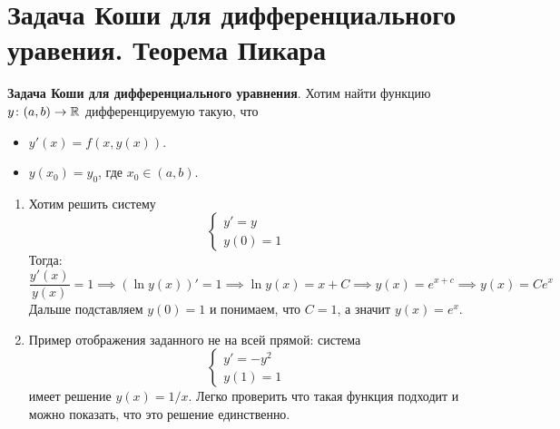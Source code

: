 \section{Задача Коши для дифференциального уравения. Теорема Пикара}
\begin{conj}
\textbf{Задача Коши для дифференциального уравнения}. Хотим найти функцию $y\colon (a, b) \to \mathbb{R}$ дифференцируемую такую, что
\begin{itemize}
    \item $y'(x) = f(x, y(x))$.
    \item $y(x_0) = y_0$, где $x_0 \in (a, b)$.
\end{itemize}
\end{conj}

\begin{examples}
\begin{enumerate}
    \item
    Хотим решить систему
    \begin{equation*}
    \begin{cases}
        y' = y \\
        y(0) = 1
    \end{cases}
    \end{equation*}
    Тогда:
    \begin{equation*}
    \frac{y'(x)}{y(x)} = 1 \implies (\ln y(x))' = 1 \implies \ln y(x) = x + C \implies y(x) = e^{x + c} \implies y(x) = Ce^x
    \end{equation*}
    Дальше подставляем $y(0) = 1$ и понимаем, что $C = 1$, а значит $y(x) = e^x$.

    \item
    Пример отображения заданного не на всей прямой: система
    \begin{equation*}
    \begin{cases}
        y' = -y^2 \\
        y(1) = 1
    \end{cases}
    \end{equation*}
    имеет решение $y(x) = 1/x$. Легко проверить что такая функция подходит и можно показать, что это решение единственно.
\end{enumerate}
\end{examples}

